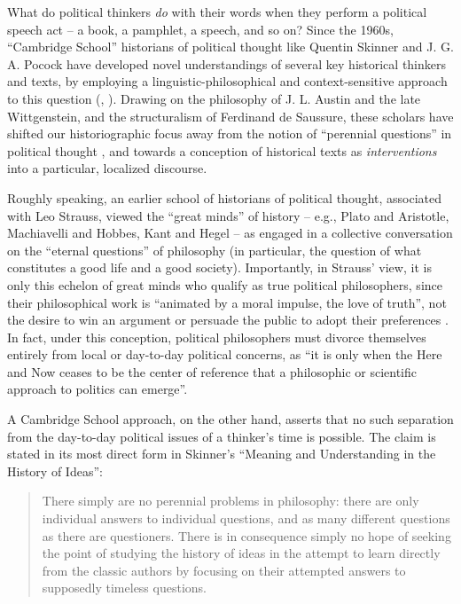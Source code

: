 What do political thinkers \textit{do} with their words when they perform a political speech act -- a book, a pamphlet, a speech, and so on? Since the 1960s, ``Cambridge School'' historians of political thought like Quentin Skinner and J. G. A. Pocock have developed novel understandings of several key historical thinkers and texts, by employing a linguistic-philosophical and context-sensitive approach to this question (\cite{skinner_meaning_1969}, \cite{pocock_virtue_1985}). Drawing on the philosophy of J. L. Austin and the late Wittgenstein, and the structuralism of Ferdinand de Saussure, these scholars have shifted our historiographic focus away from the notion of ``perennial questions'' in political thought \parencite{bevir_are_1994}, and towards a conception of historical texts as \textit{interventions} into a particular, localized discourse.

Roughly speaking, an earlier school of historians of political thought, associated with Leo Strauss, viewed the ``great minds'' of history -- e.g., Plato and Aristotle, Machiavelli and Hobbes, Kant and Hegel -- as engaged in a collective conversation on the ``eternal questions'' of philosophy (in particular, the question of what constitutes a good life and a good society). Importantly, in Strauss' view, it is only this echelon of great minds who qualify as true political philosophers, since their philosophical work is ``animated by a moral impulse, the love of truth'', not the desire to win an argument or persuade the public to adopt their preferences \parencite{strauss_what_1959}. In fact, under this conception, political philosophers must divorce themselves entirely from local or day-to-day political concerns, as ``it is only when the Here and Now ceases to be the center of reference that a philosophic or scientific approach to politics can emerge''.

A Cambridge School approach, on the other hand, asserts that no such separation from the day-to-day political issues of a thinker's time is possible. The claim is stated in its most direct form in Skinner's ``Meaning and Understanding in the History of Ideas'':

\begin{quote}
There simply are no perennial problems in philosophy: there are only individual answers to individual questions, and as many different questions as there are questioners. There is in consequence simply no hope of seeking the point of studying the history of ideas in the attempt to learn directly from the classic authors by focusing on their attempted answers to supposedly timeless questions.
\end{quote}

